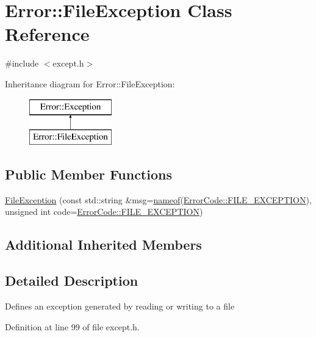 \hypertarget{class_error_1_1_file_exception}{}\section{Error\+:\+:File\+Exception Class Reference}
\label{class_error_1_1_file_exception}


{\ttfamily \#include $<$except.\+h$>$}

Inheritance diagram for Error\+:\+:File\+Exception\+:\begin{figure}[H]
\begin{center}
\leavevmode
\includegraphics[height=2.000000cm]{class_error_1_1_file_exception}
\end{center}
\end{figure}
\subsection*{Public Member Functions}
\begin{DoxyCompactItemize}
\item 
\hyperlink{class_error_1_1_file_exception_a9adb383bcc390b30299e87d6820a5a5b}{File\+Exception} (const std\+::string \&msg=\hyperlink{macros_8h_a235bdec0a6bf62f3b3af87e528109847}{nameof}(\hyperlink{namespace_error_1_1_error_code_ad646bbf666b6a07dc245d1e1b47107be}{Error\+Code\+::\+F\+I\+L\+E\+\_\+\+E\+X\+C\+E\+P\+T\+I\+ON}), unsigned int code=\hyperlink{namespace_error_1_1_error_code_ad646bbf666b6a07dc245d1e1b47107be}{Error\+Code\+::\+F\+I\+L\+E\+\_\+\+E\+X\+C\+E\+P\+T\+I\+ON})
\end{DoxyCompactItemize}
\subsection*{Additional Inherited Members}


\subsection{Detailed Description}
Defines an exception generated by reading or writing to a file 

Definition at line 99 of file except.\+h.



